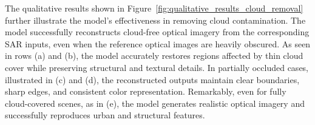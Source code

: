 The qualitative results shown in Figure~\ref{fig:qualitative_results_cloud_removal} further illustrate the model’s effectiveness in removing cloud contamination. The model successfully reconstructs cloud-free optical imagery from the corresponding SAR inputs, even when the reference optical images are heavily obscured. As seen in rows (a) and (b), the model accurately restores regions affected by thin cloud cover while preserving structural and textural details. In partially occluded cases, illustrated in (c) and (d), the reconstructed outputs maintain clear boundaries, sharp edges, and consistent color representation. Remarkably, even for fully cloud-covered scenes, as in (e), the model generates realistic optical imagery and successfully reproduces urban and structural features.

\begin{figure}[!htbp]
    \centering
    \setlength{\tabcolsep}{2pt} %
    \renewcommand{\arraystretch}{1.0} %


\end{figure}
